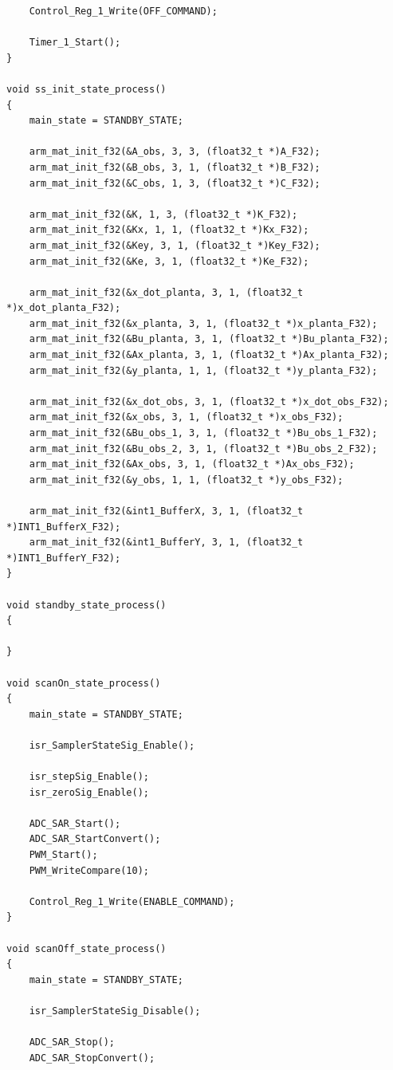 \documentclass[
	article,			%
	11pt,				%
	oneside,			%
	a4paper,			%
	english,			%
	brazil,				%
	sumario=tradicional
	]{abntex2}
\begin{document}
\begin{apendicesenv}
\begin{lstlisting}
    Control_Reg_1_Write(OFF_COMMAND);
    
    Timer_1_Start();
}

void ss_init_state_process()
{
    main_state = STANDBY_STATE;
    
    arm_mat_init_f32(&A_obs, 3, 3, (float32_t *)A_F32);
    arm_mat_init_f32(&B_obs, 3, 1, (float32_t *)B_F32);
    arm_mat_init_f32(&C_obs, 1, 3, (float32_t *)C_F32);
    
    arm_mat_init_f32(&K, 1, 3, (float32_t *)K_F32);
    arm_mat_init_f32(&Kx, 1, 1, (float32_t *)Kx_F32);
    arm_mat_init_f32(&Key, 3, 1, (float32_t *)Key_F32);
    arm_mat_init_f32(&Ke, 3, 1, (float32_t *)Ke_F32);
    
    arm_mat_init_f32(&x_dot_planta, 3, 1, (float32_t *)x_dot_planta_F32);
    arm_mat_init_f32(&x_planta, 3, 1, (float32_t *)x_planta_F32);
    arm_mat_init_f32(&Bu_planta, 3, 1, (float32_t *)Bu_planta_F32);
    arm_mat_init_f32(&Ax_planta, 3, 1, (float32_t *)Ax_planta_F32);
    arm_mat_init_f32(&y_planta, 1, 1, (float32_t *)y_planta_F32);

    arm_mat_init_f32(&x_dot_obs, 3, 1, (float32_t *)x_dot_obs_F32);
    arm_mat_init_f32(&x_obs, 3, 1, (float32_t *)x_obs_F32);
    arm_mat_init_f32(&Bu_obs_1, 3, 1, (float32_t *)Bu_obs_1_F32);
    arm_mat_init_f32(&Bu_obs_2, 3, 1, (float32_t *)Bu_obs_2_F32);
    arm_mat_init_f32(&Ax_obs, 3, 1, (float32_t *)Ax_obs_F32);
    arm_mat_init_f32(&y_obs, 1, 1, (float32_t *)y_obs_F32);
    
    arm_mat_init_f32(&int1_BufferX, 3, 1, (float32_t *)INT1_BufferX_F32);
    arm_mat_init_f32(&int1_BufferY, 3, 1, (float32_t *)INT1_BufferY_F32);
}

void standby_state_process()
{
    
}

void scanOn_state_process()
{
    main_state = STANDBY_STATE;
    
    isr_SamplerStateSig_Enable();
    
    isr_stepSig_Enable();
    isr_zeroSig_Enable();
    
    ADC_SAR_Start();
    ADC_SAR_StartConvert();
    PWM_Start();
    PWM_WriteCompare(10);
    
    Control_Reg_1_Write(ENABLE_COMMAND);
}

void scanOff_state_process()
{
    main_state = STANDBY_STATE;
    
    isr_SamplerStateSig_Disable();
    
    ADC_SAR_Stop();
    ADC_SAR_StopConvert();
    

\end{lstlisting}
\end{apendicesenv}
\end{document}
